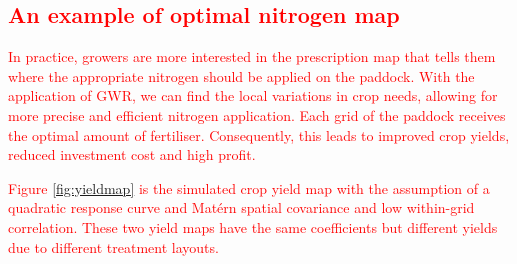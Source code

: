 \documentclass[a4paper]{article} 	%
\newcommand{\Matern}{Mat\'ern }
\newcommand{\zc}[1]{\textcolor{red}{#1}}
\begin{document}
\subsection{\zc{An example of optimal nitrogen map}}


\zc{In practice, growers are more interested in the prescription map that tells them where the appropriate nitrogen should be applied on the paddock. With the application of GWR, we can find the local variations in crop needs, allowing for more precise and efficient nitrogen application. Each grid of the paddock receives the optimal amount of fertiliser. Consequently, this leads to improved crop yields, reduced investment cost and high profit.}


\zc{Figure \ref{fig:yieldmap} is the simulated crop yield map with the assumption of a quadratic response curve and \Matern spatial covariance and low within-grid correlation. These two yield maps have the same coefficients but different yields due to different treatment layouts.}
\end{document}
